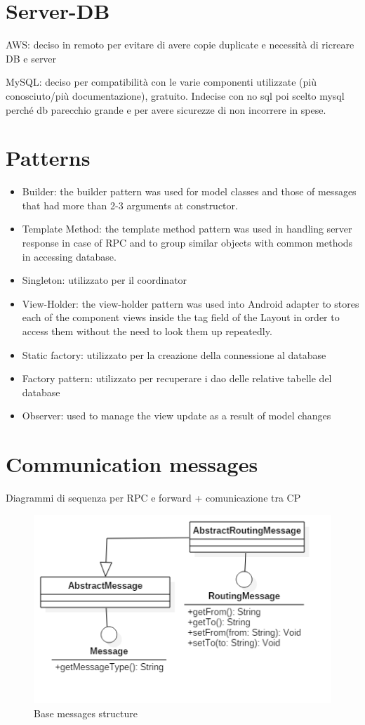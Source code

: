 \documentclass[a4paper,12pt]{report}
\begin{document}
\section{Server-DB}
AWS: deciso in remoto per evitare di avere copie duplicate e necessità di ricreare DB e server

MySQL: deciso per compatibilità con le varie componenti utilizzate (più conosciuto/più documentazione), gratuito.
Indecise con no sql poi scelto mysql perché db parecchio grande e per avere sicurezze di non incorrere in spese.

\section{Patterns}
\begin{itemize}
\item Builder: the builder pattern was used for model classes and those of messages that had more than 2-3 arguments at constructor.
\item Template Method: the template method pattern was used in handling server response in case of RPC and to group similar objects with common methods in accessing database.
\item Singleton: utilizzato per il coordinator %
\item View-Holder: the view-holder pattern was used into Android adapter to stores each of the component views inside the tag field of the Layout in order to access them without the need to look them up repeatedly. %
\item Static factory: utilizzato per la creazione della connessione al database %
\item Factory pattern: utilizzato per recuperare i dao delle relative tabelle del database %
\item Observer: used to manage the view update as a result of model changes %
\end{itemize}

\section{Communication messages}

Diagrammi di sequenza per RPC e forward + comunicazione tra CP

\begin{figure}[ht]
\centering
\includegraphics[scale=0.5]{figures/messages.png}
\caption{Base messages structure}
\end{figure}
\end{document}

